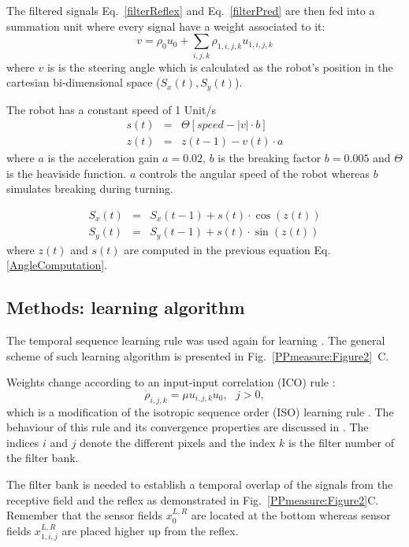 The filtered signals Eq.~\ref{filterReflex} and Eq.~\ref{filterPred}
are then fed into a summation unit where every signal
have a weight associated to it:
\begin{equation}
v = \rho_0 u_0 + \sum\limits_{i,j,k} \rho_{1,i,j,k} u_{1,i,j,k}
\label{NeuralOutput}
\end{equation}
where $v$ is is the steering angle which is calculated as the robot's
position in the cartesian bi-dimensional space ($S_x(t), S_y(t)$).

The robot has a constant speed of 1 Unit/s
\begin{eqnarray}
	s(t)& = & \Theta\left[speed-|v|\cdot b\right ]\\
	z(t)& = & z(t-1)-v(t) \cdot a \label{AngleComputation}
\end{eqnarray}
where $a$ is the acceleration gain 
$a=0.02$, $b$ is the breaking factor $b=0.005$ and $\Theta$
is the heaviside function.
$a$ controls the angular speed of the robot whereas $b$ simulates
breaking during turning.

\begin{eqnarray}
	S_x(t) & = & S_x(t-1)+s(t)\cdot\cos(z(t))\label{PositionComputationx}\\
	S_y(t) & = & S_y(t-1)+s(t)\cdot\sin(z(t))\label{PositionComputationy}
\end{eqnarray}
where $z(t)$ and $s(t)$ are computed in the previous equation
Eq.\ref{AngleComputation}.


\subsection{Methods: learning algorithm}

The temporal sequence learning rule was used again for learning \citep{Porr06}. 
The general scheme of such learning algorithm is presented in Fig.~\ref{PPmeasure:Figure2}~C. 

Weights change according to an input-input correlation (ICO) rule :
\begin{equation}
\dot\rho_{i,j,k} = \mu u_{i,j,k} \dot{u}_0,~~~j>0,
\end{equation}
which is a modification of the isotropic sequence order (ISO) learning rule \citep{Porr03a}. 
The behaviour of this rule and its convergence properties are discussed in \citep{Porr06}. 
The indices $i$ and $j$ denote the different pixels and the index
$k$ is the filter number of the filter bank. 

The filter bank is needed to establish a temporal overlap of the
signals from the receptive field and the reflex
as demonstrated in
Fig.~\ref{PPmeasure:Figure2}C.
Remember that the
sensor fields $x_0^{L,R}$ are located at the bottom whereas sensor
fields $x_{1,i,j}^{L,R}$ are placed higher up from the reflex.

